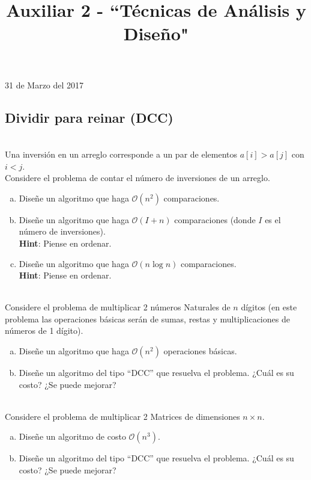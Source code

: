 \documentclass[dcc,uchile]{fcfmcourse}
\title{Auxiliar 2 - ``Técnicas de Análisis y Diseño"}
\begin{document}
\maketitle
\begin{center}
31 de Marzo del 2017
\end{center}
\vspace{-1ex}


\begin{problems}
\section*{Dividir para reinar (DCC)}
\\
Una inversión en un arreglo corresponde a un par de elementos $a[i] > a[j]$ con $i < j$.\\
Considere el problema de contar el número de inversiones de un arreglo.
\begin{enumerate}[a)]
    \item Diseñe un algoritmo que haga $\mathcal{O} (n^2)$ comparaciones.
    \item Diseñe un algoritmo que haga $\mathcal{O} (I + n)$ comparaciones (donde $I$ es el número de inversiones).\\ \textbf{Hint}: Piense en ordenar.
    \item Diseñe un algoritmo que haga $\mathcal{O} (n\log n)$ comparaciones.\\ \textbf{Hint}: Piense en ordenar.
\end{enumerate}
\\
Considere el problema de multiplicar 2 números Naturales de $n$ dígitos (en este problema las operaciones básicas serán de sumas, restas y multiplicaciones de números de 1 dígito).
\begin{enumerate}[a)]
    \item Diseñe un algoritmo que haga $\mathcal{O}(n^2)$ operaciones básicas.
    \item Diseñe un algoritmo del tipo ``DCC'' que resuelva el problema. ¿Cuál es su costo? ¿Se puede mejorar?
\end{enumerate}
\\
Considere el problema de multiplicar 2 Matrices de dimensiones $n\times n$.
\begin{enumerate}[a)]
    \item Diseñe un algoritmo de costo $\mathcal{O}(n^3)$.
    \item Diseñe un algoritmo del tipo ``DCC'' que resuelva el problema. ¿Cuál es su costo? ¿Se puede mejorar?
\end{enumerate}
\newpage

\end{problems}
\end{document}
